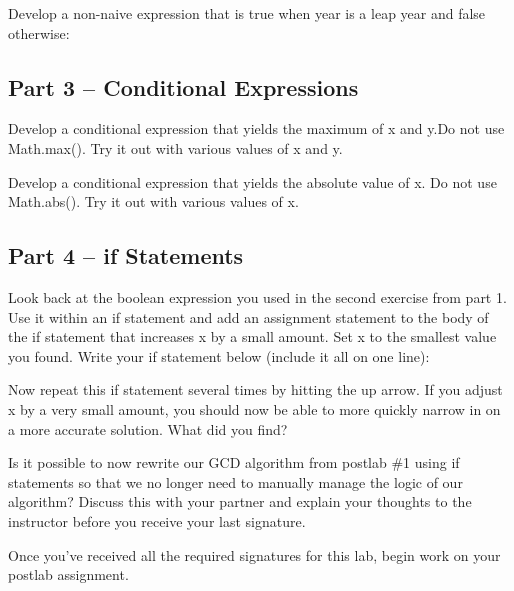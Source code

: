 \begin{exer}
Develop a non-naive expression that is true when year is a leap year and false otherwise:

\evallinethree

\end{exer}

\initialbox


\subsection{Part 3 -- Conditional Expressions}

\begin{exer}
Develop a conditional expression that yields the maximum of x and y.Do not use Math.max(). Try it out with various values of x and y.

\evalline
\end{exer}

\begin{exer}
Develop a conditional expression that yields the absolute value of x. Do not use Math.abs(). Try it out with various values of x.

\evalline
\end{exer}


\initialbox


\subsection{Part 4 -- if Statements}

\begin{exer}
Look back at the boolean expression you used in the second exercise from part 1. Use it within an if statement and add an assignment statement to the body of the if statement that increases x by a small amount. Set x to the smallest value you found. Write your if statement below (include it all on one line):

\evalline

Now repeat this if statement several times by hitting the up arrow. If you adjust x by a very small amount, you should now be able to more quickly narrow in on a more accurate solution. What did you find?

\evalline

\end{exer}

Is it possible to now rewrite our GCD algorithm from postlab \#1 using if statements so that we no longer need to manually manage the logic of our algorithm? Discuss this with your partner and explain your thoughts to the instructor before you receive your last signature. 



\initialbox

Once you've received all the required signatures for this lab, begin work on your postlab assignment. 
